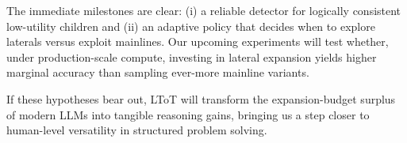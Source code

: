 \documentclass{IEEEtran}
\begin{document}
The immediate milestones are clear: (i) a reliable detector for logically consistent low-utility children and (ii) an adaptive policy that decides when to explore laterals versus exploit mainlines.
Our upcoming experiments will test whether, under production-scale compute, investing in lateral expansion yields higher marginal accuracy than sampling ever-more mainline variants.

If these hypotheses bear out, LToT will transform the expansion-budget surplus of modern LLMs into tangible reasoning gains, bringing us a step closer to human-level versatility in structured problem solving.

\printbibliography
\end{document}
